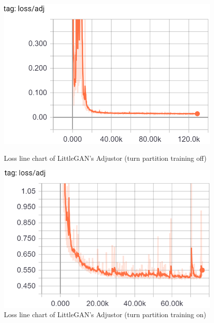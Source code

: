    \begin{figure}
        \begin{minipage}[t]{0.49\linewidth}
            \centering
            \includegraphics[width=\textwidth]{figures/loss_part_off_a.png}
            \caption{Loss line chart of LittleGAN's Adjustor (turn partition training off)}
            \label{loss_part_off_u}
        \end{minipage}
            \hfill
        \begin{minipage}[t]{0.49\linewidth}
            \centering
            \includegraphics[width=\textwidth]{figures/loss_part_on_a.png}
            \caption{Loss line chart of LittleGAN's Adjustor (turn partition training on)}
            \label{loss_part_on_u}
        \end{minipage}
    \end{figure}

